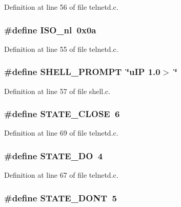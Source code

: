 Definition at line 56 of file telnetd.c.

\hypertarget{group__telnetd_ga3212e70c55244608ac16316888c354f0}{
\subsubsection[{ISO\_\-nl}]{\setlength{\rightskip}{0pt plus 5cm}\#define ISO\_\-nl~0x0a}}
\label{group__telnetd_ga3212e70c55244608ac16316888c354f0}


Definition at line 55 of file telnetd.c.

\hypertarget{group__telnetd_gaaa60ca995565b799bb958c806e933665}{
\subsubsection[{SHELL\_\-PROMPT}]{\setlength{\rightskip}{0pt plus 5cm}\#define SHELL\_\-PROMPT~\char`\"{}uIP 1.0$>$ \char`\"{}}}
\label{group__telnetd_gaaa60ca995565b799bb958c806e933665}


Definition at line 57 of file shell.c.

\hypertarget{group__telnetd_ga57aca709a33690cd4fb73fe199fa1bdd}{
\subsubsection[{STATE\_\-CLOSE}]{\setlength{\rightskip}{0pt plus 5cm}\#define STATE\_\-CLOSE~6}}
\label{group__telnetd_ga57aca709a33690cd4fb73fe199fa1bdd}


Definition at line 69 of file telnetd.c.

\hypertarget{group__telnetd_gabfc1d8d15852318927cda30e1bc0470a}{
\subsubsection[{STATE\_\-DO}]{\setlength{\rightskip}{0pt plus 5cm}\#define STATE\_\-DO~4}}
\label{group__telnetd_gabfc1d8d15852318927cda30e1bc0470a}


Definition at line 67 of file telnetd.c.

\hypertarget{group__telnetd_gaaaaaf66ea67900c36d01136d5bad1168}{
\subsubsection[{STATE\_\-DONT}]{\setlength{\rightskip}{0pt plus 5cm}\#define STATE\_\-DONT~5}}
\label{group__telnetd_gaaaaaf66ea67900c36d01136d5bad1168}


